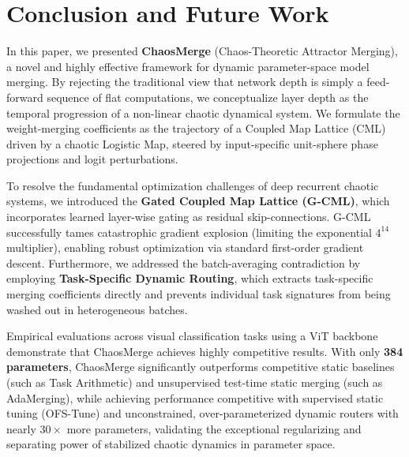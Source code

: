 \section{Conclusion and Future Work}
\label{sec:conclusion}

In this paper, we presented \textbf{ChaosMerge} (Chaos-Theoretic Attractor Merging), a novel and highly effective framework for dynamic parameter-space model merging. By rejecting the traditional view that network depth is simply a feed-forward sequence of flat computations, we conceptualize layer depth as the temporal progression of a non-linear chaotic dynamical system. We formulate the weight-merging coefficients as the trajectory of a Coupled Map Lattice (CML) driven by a chaotic Logistic Map, steered by input-specific unit-sphere phase projections and logit perturbations.

To resolve the fundamental optimization challenges of deep recurrent chaotic systems, we introduced the \textbf{Gated Coupled Map Lattice (G-CML)}, which incorporates learned layer-wise gating as residual skip-connections. G-CML successfully tames catastrophic gradient explosion (limiting the exponential $4^{14}$ multiplier), enabling robust optimization via standard first-order gradient descent. Furthermore, we addressed the batch-averaging contradiction by employing \textbf{Task-Specific Dynamic Routing}, which extracts task-specific merging coefficients directly and prevents individual task signatures from being washed out in heterogeneous batches.

Empirical evaluations across visual classification tasks using a ViT backbone demonstrate that ChaosMerge achieves highly competitive results. With only \textbf{384 parameters}, ChaosMerge significantly outperforms competitive static baselines (such as Task Arithmetic) and unsupervised test-time static merging (such as AdaMerging), while achieving performance competitive with supervised static tuning (OFS-Tune) and unconstrained, over-parameterized dynamic routers with nearly $30\times$ more parameters, validating the exceptional regularizing and separating power of stabilized chaotic dynamics in parameter space.

